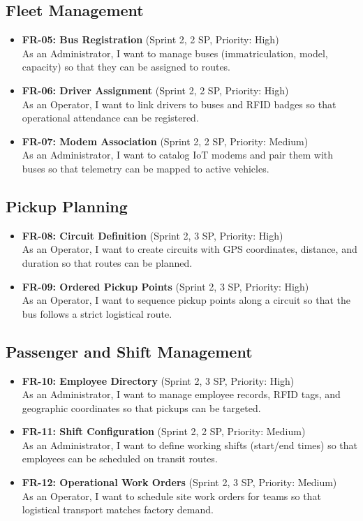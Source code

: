 \subsection{Fleet Management}
\begin{itemize}
  \item \textbf{FR-05: Bus Registration} (Sprint 2, 2 SP, Priority: High) \\
  As an Administrator, I want to manage buses (immatriculation, model, capacity) so that they can be assigned to routes.
  \item \textbf{FR-06: Driver Assignment} (Sprint 2, 2 SP, Priority: High) \\
  As an Operator, I want to link drivers to buses and RFID badges so that operational attendance can be registered.
  \item \textbf{FR-07: Modem Association} (Sprint 2, 2 SP, Priority: Medium) \\
  As an Administrator, I want to catalog IoT modems and pair them with buses so that telemetry can be mapped to active vehicles.
\end{itemize}

\subsection{Pickup Planning}
\begin{itemize}
  \item \textbf{FR-08: Circuit Definition} (Sprint 2, 3 SP, Priority: High) \\
  As an Operator, I want to create circuits with GPS coordinates, distance, and duration so that routes can be planned.
  \item \textbf{FR-09: Ordered Pickup Points} (Sprint 2, 3 SP, Priority: High) \\
  As an Operator, I want to sequence pickup points along a circuit so that the bus follows a strict logistical route.
\end{itemize}

\subsection{Passenger and Shift Management}
\begin{itemize}
  \item \textbf{FR-10: Employee Directory} (Sprint 2, 3 SP, Priority: High) \\
  As an Administrator, I want to manage employee records, RFID tags, and geographic coordinates so that pickups can be targeted.
  \item \textbf{FR-11: Shift Configuration} (Sprint 2, 2 SP, Priority: Medium) \\
  As an Administrator, I want to define working shifts (start/end times) so that employees can be scheduled on transit routes.
  \item \textbf{FR-12: Operational Work Orders} (Sprint 2, 3 SP, Priority: Medium) \\
  As an Operator, I want to schedule site work orders for teams so that logistical transport matches factory demand.
\end{itemize}

